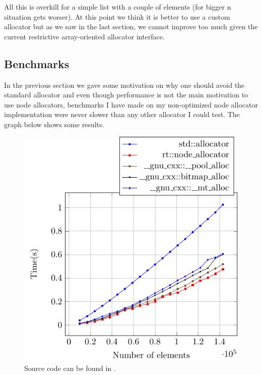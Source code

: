 \documentclass[11pt]{article}
\begin{document}
All this is overkill for a simple list with a couple of elements
(for bigger n situation gets worser). At this point we think it is
better to use a custom allocator but as we saw in the last section,
we cannot improve too much given the current restrictive array-oriented
allocator interface.

\subsection{Benchmarks}

In the previous section we gave some motivation on why one should avoid
the standard allocator and even though performance is not the main motivation
to use node allocators, benchmarks I have made on my non-optimized
node allocator implementation were never slower than any other allocator
I could test.  The graph below shows some results.

\begin{figure}[ht]
    \centering
    \includegraphics[scale=1]{fig/node_alloc_bench.pdf}
    \caption[Benchmark]
    {Source code can be found in \cite{rtcpp}.}
    \label{fig::bench}
\end{figure}

\end{document}
